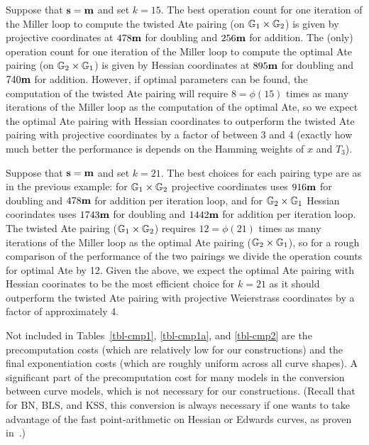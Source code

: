 \begin{example}
Suppose that $\textbf{s} = \textbf{m}$ and set $k = 15$.
The best operation count for one iteration of the Miller loop to compute the twisted Ate pairing (on $\mathbb{G}_{1} \times \mathbb{G}_{2}$) is given by projective coordinates at 
$478\textbf{m}$ for doubling and $256\textbf{m}$ for addition.
The (only) operation count for one iteration of the Miller loop to compute the optimal Ate pairing (on $\mathbb{G}_{2} \times \mathbb{G}_{1}$) is given by Hessian coordinates at
$895\textbf{m}$ for doubling and $740\textbf{m}$ for addition. 
However, if optimal parameters can be found, the computation of the twisted Ate pairing 
will require $8 = \phi(15)$ times as many iterations of the Miller loop as the computation of the optimal Ate, so we expect the optimal Ate pairing with Hessian coordinates to outperform the twisted Ate pairing with projective coordinates by a factor of between 3 and 4
(exactly how much better the performance is depends on the Hamming weights of $x$ and $T_3$).
\end{example}

\begin{example}
Suppose that $\textbf{s} = \textbf{m}$ and set $k = 21$.
The best choices for each pairing type are as in the previous example: 
for $\mathbb{G}_{1} \times \mathbb{G}_{2}$ projective coordinates uses $916\textbf{m}$ for doubling and $478\textbf{m}$ for addition per iteration loop,
and for $\mathbb{G}_{2} \times \mathbb{G}_{1}$ Hessian coorindates uses $1743\textbf{m}$ for doubling and $1442\textbf{m}$ for addition per iteration loop.
The twisted Ate pairing ($\mathbb{G}_{1} \times \mathbb{G}_{2}$) requires $12 = \phi(21)$ times
as many iterations of the Miller loop as the optimal Ate pairing ($\mathbb{G}_{2} \times \mathbb{G}_{1}$), 
so for a rough comparison of the performance of the two pairings we divide the operation counts for optimal Ate by 12. 
Given the above, we expect the optimal Ate pairing with Hessian coorinates to be the most efficient choice for $k=21$ as it should outperform the twisted Ate pairing with projective Weierstrass coordinates by a factor of approximately 4.
\end{example}

Not included in Tables~\ref{tbl-cmp1}, \ref{tbl-cmp1a}, and \ref{tbl-cmp2} are the 
precomputation costs (which are relatively low for our constructions) and the final exponentiation costs (which are roughly uniform across all curve shapes).
A significant part of the precomputation cost for many models in the conversion
between curve models, which is not necessary for our constructions.
(Recall that for BN, BLS, and KSS, this conversion is always necessary if one wants to take advantage of
the fast point-arithmetic on Hessian or Edwards curves, as proven in~\cite{2013/bos-pairing}.)

